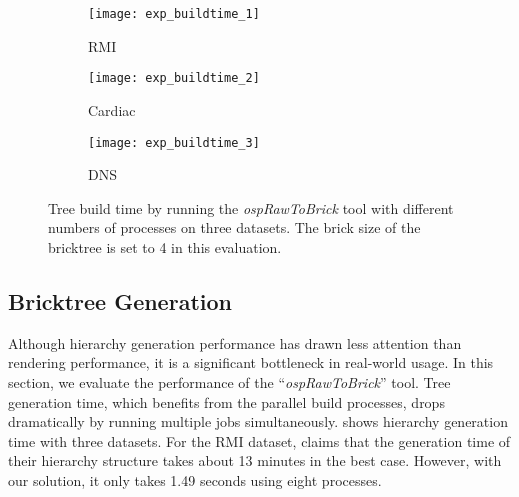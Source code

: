 \begin{figure}[h]
    \centering
    \begin{subfigure}[b]{0.32\columnwidth}
        \texttt{[image: exp\_buildtime\_1]}
        \vspace{-1.5em}
        \caption{RMI}
        \label{fig:exp_buildtime_1}
    \end{subfigure}
    \begin{subfigure}[b]{0.32\columnwidth}
        \texttt{[image: exp\_buildtime\_2]}
        \vspace{-1.5em}
        \caption{Cardiac}
        \label{fig:exp_buildtime_2}
    \end{subfigure}
    \begin{subfigure}[b]{0.32\columnwidth}
        \texttt{[image: exp\_buildtime\_3]}
        \vspace{-1.5em}
        \caption{DNS}
        \label{fig:exp_buildtime_3}
    \end{subfigure}
   
	\caption{\label{fig:exp_buildtime}%
	Tree build time by running the \textit{ospRawToBrick} tool with different numbers of processes on three datasets. The brick size of the bricktree is set to 4 in this evaluation.}
	\vspace{-0.5em}
\end{figure}

\subsection{Bricktree Generation}

Although hierarchy generation performance has drawn less attention than rendering
performance, it is a significant bottleneck in real-world usage\cite{fogal2013analysis}. 
In this section, we evaluate the performance of the ``\textit{ospRawToBrick}'' tool. 
Tree generation time, which benefits from the parallel build processes, drops
dramatically by running multiple jobs simultaneously.  shows
 hierarchy generation time with three datasets. For the RMI dataset, \cite{fogal2013analysis} claims that the generation time of their hierarchy structure takes
about 13 minutes in the best case. However, with our solution, it only takes 1.49 seconds using eight processes. 



